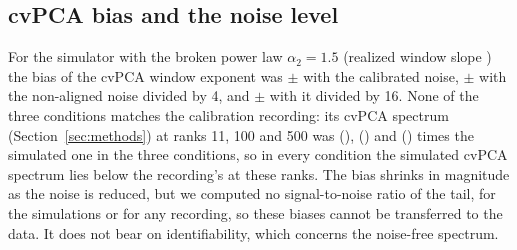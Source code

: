\subsection{cvPCA bias and the noise level}\label{sec:cvpca}

For the simulator with the broken power law $\alpha_2 = 1.5$ (realized window slope \SnrTruth{}) the bias of the cvPCA window exponent was \SnrBiasOne{} $\pm$ \SnrSEOne{} with the calibrated noise, \SnrBiasFour{} $\pm$ \SnrSEFour{} with the non-aligned noise divided by 4, and \SnrBiasSixteen{} $\pm$ \SnrSESixteen{} with it divided by 16. None of the three conditions matches the calibration recording: its cvPCA spectrum (Section~\ref{sec:methods}) at ranks 11, 100 and 500 was (\SnrRatioOne{}), (\SnrRatioFour{}) and (\SnrRatioSixteen{}) times the simulated one in the three conditions, so in every condition the simulated cvPCA spectrum lies below the recording's at these ranks. The bias shrinks in magnitude as the noise is reduced, but we computed no signal-to-noise ratio of the tail, for the simulations or for any recording, so these biases cannot be transferred to the data. It does not bear on identifiability, which concerns the noise-free spectrum.
